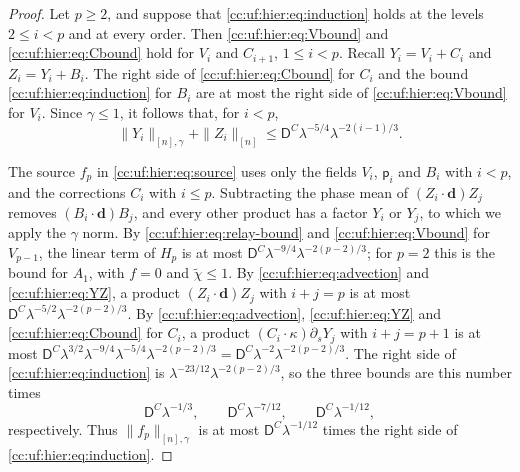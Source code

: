 \begin{proof}
Let $p\ge2$, and suppose that \eqref{cc:uf:hier:eq:induction} holds at
the levels $2\le i<p$ and at every order. Then
\eqref{cc:uf:hier:eq:Vbound} and \eqref{cc:uf:hier:eq:Cbound} hold for
$V_i$ and $C_{i+1}$, $1\le i<p$. Recall $Y_i=V_i+C_i$ and $Z_i=Y_i+B_i$.
The right side of \eqref{cc:uf:hier:eq:Cbound} for $C_i$ and the
bound \eqref{cc:uf:hier:eq:induction} for $B_i$ are at most the right
side of \eqref{cc:uf:hier:eq:Vbound} for $V_i$. Since
$\gamma\le1$, it follows that, for $i<p$,
\begin{equation}\label{cc:uf:hier:eq:YZ}
 \|Y_i\|_{[n],\gamma}+\|Z_i\|_{[n]}
 \le\mathsf D^C\lambda^{-5/4}\lambda^{-2(i-1)/3}.
\end{equation}

The source $f_p$ in \eqref{cc:uf:hier:eq:source} uses only the
fields $V_i$, $\mathsf p_i$ and $B_i$ with $i<p$, and the corrections
$C_i$ with $i\le p$. Subtracting the phase mean of $(Z_i\cdot\mathbf d)Z_j$
removes $(B_i\cdot\mathbf d)B_j$, and every other product has a
factor $Y_i$ or $Y_j$, to which we apply the $\gamma$ norm.
By \eqref{cc:uf:hier:eq:relay-bound} and \eqref{cc:uf:hier:eq:Vbound}
for $V_{p-1}$, the linear term of $H_p$ is at most
$\mathsf D^C\lambda^{-9/4}\lambda^{-2(p-2)/3}$; for $p=2$
this is the bound for $A_1$, with $f=0$ and $\widetilde\chi\le1$. By
\eqref{cc:uf:hier:eq:advection} and \eqref{cc:uf:hier:eq:YZ}, a product
$(Z_i\cdot\mathbf d)Z_j$ with $i+j=p$ is at most
$\mathsf D^C\lambda^{-5/2}\lambda^{-2(p-2)/3}$. By
\eqref{cc:uf:hier:eq:advection}, \eqref{cc:uf:hier:eq:YZ} and
\eqref{cc:uf:hier:eq:Cbound} for $C_i$, a product
$(C_i\cdot\kappa)\partial_sY_j$ with $i+j=p+1$ is at most
$\mathsf D^C\lambda^{3/2}\lambda^{-9/4}\lambda^{-5/4}\lambda^{-2(p-2)/3}
=\mathsf D^C\lambda^{-2}\lambda^{-2(p-2)/3}$. The right side of
\eqref{cc:uf:hier:eq:induction} is
$\lambda^{-23/12}\lambda^{-2(p-2)/3}$, so the three bounds are this
number times
\[
 \mathsf D^C\lambda^{-1/3},\qquad
 \mathsf D^C\lambda^{-7/12},\qquad
 \mathsf D^C\lambda^{-1/12},
\]
respectively. Thus $\|f_p\|_{[n],\gamma}$ is at most
$\mathsf D^C\lambda^{-1/12}$ times the right side of
\eqref{cc:uf:hier:eq:induction}.


\end{proof}
